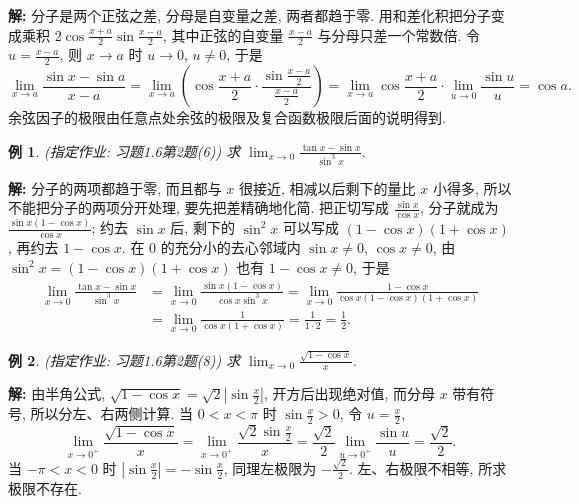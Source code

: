 \documentclass[UTF8,openany]{ctexbook}
\theoremstyle{chinesetextbook}
\newtheorem{example}{例}[section]
\newenvironment{cnsolution}{\par\indent\textbf{解:} \ignorespaces}{\par}
\begin{document}
\begin{cnsolution}
分子是两个正弦之差, 分母是自变量之差, 两者都趋于零. 用和差化积把分子变成乘积 $\displaystyle2\cos\frac{x+a}2\sin\frac{x-a}2$, 其中正弦的自变量 $\displaystyle\frac{x-a}2$ 与分母只差一个常数倍. 令 $\displaystyle u=\frac{x-a}2$, 则 $x\to a$ 时 $u\to0$, $u\ne0$, 于是
\[
\lim_{x\to a}\frac{\sin x-\sin a}{x-a}=\lim_{x\to a}\left(\cos\frac{x+a}2\cdot\frac{\sin\frac{x-a}2}{\frac{x-a}2}\right)=\lim_{x\to a}\cos\frac{x+a}2\cdot\lim_{u\to0}\frac{\sin u}u=\cos a.
\]
余弦因子的极限由任意点处余弦的极限及复合函数极限后面的说明得到.
\end{cnsolution}
\begin{example}
\textnormal{(指定作业: 习题1.6第2题(6))} 求 $\displaystyle\lim_{x\to0}\frac{\tan x-\sin x}{\sin^3x}$.
\end{example}
\begin{cnsolution}
分子的两项都趋于零, 而且都与 $x$ 很接近, 相减以后剩下的量比 $x$ 小得多, 所以不能把分子的两项分开处理, 要先把差精确地化简. 把正切写成 $\displaystyle\frac{\sin x}{\cos x}$, 分子就成为 $\displaystyle\frac{\sin x(1-\cos x)}{\cos x}$; 约去 $\sin x$ 后, 剩下的 $\sin^2x$ 可以写成 $(1-\cos x)(1+\cos x)$, 再约去 $1-\cos x$. 在 $0$ 的充分小的去心邻域内 $\sin x\ne0$, $\cos x\ne0$, 由 $\sin^2x=(1-\cos x)(1+\cos x)$ 也有 $1-\cos x\ne0$, 于是
\[
\begin{aligned}
\lim_{x\to0}\frac{\tan x-\sin x}{\sin^3x}
&=\lim_{x\to0}\frac{\sin x(1-\cos x)}{\cos x\sin^3x}=\lim_{x\to0}\frac{1-\cos x}{\cos x(1-\cos x)(1+\cos x)}\\
&=\lim_{x\to0}\frac1{\cos x(1+\cos x)}=\frac1{1\cdot2}=\frac12.
\end{aligned}
\]
\end{cnsolution}
\begin{example}
\textnormal{(指定作业: 习题1.6第2题(8))} 求 $\displaystyle\lim_{x\to0}\frac{\sqrt{1-\cos x}}x$.
\end{example}
\begin{cnsolution}
由半角公式, $\displaystyle\sqrt{1-\cos x}=\sqrt2\left|\sin\frac x2\right|$, 开方后出现绝对值, 而分母 $x$ 带有符号, 所以分左、右两侧计算. 当 $0<x<\pi$ 时 $\displaystyle\sin\frac x2>0$, 令 $\displaystyle u=\frac x2$,
\[
\lim_{x\to0^+}\frac{\sqrt{1-\cos x}}x=\lim_{x\to0^+}\frac{\sqrt2\sin\frac x2}x=\frac{\sqrt2}2\lim_{u\to0^+}\frac{\sin u}u=\frac{\sqrt2}2.
\]
当 $-\pi<x<0$ 时 $\displaystyle\left|\sin\frac x2\right|=-\sin\frac x2$, 同理左极限为 $\displaystyle-\frac{\sqrt2}2$. 左、右极限不相等, 所求极限不存在.
\end{cnsolution}
\end{document}
